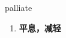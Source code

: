 
\begin{frame}
{\huge palliate}
\begin{center}
\begin{enumerate}\Large
  \item \textbf{平息，减轻}
\end{enumerate}
\end{center}
\end{frame}
